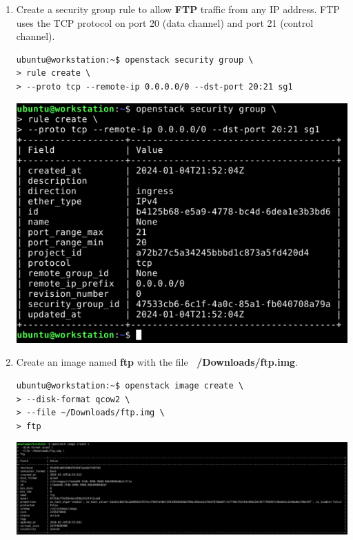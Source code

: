 \documentclass[letterpaper, 12pt]{article}
\begin{document}
\begin{enumerate}
    \item Create a security group rule to allow \textbf{FTP} traffic from any IP address. FTP uses the TCP protocol on
    port 20 (data channel) and port 21 (control channel).
\begin{lstlisting}
ubuntu@workstation:~$ openstack security group \
> rule create \
> --proto tcp --remote-ip 0.0.0.0/0 --dst-port 20:21 sg1
\end{lstlisting}

    \begin{center}
        \includegraphics[width=\linewidth]{images/part1/step32.png}
    \end{center}

    \item Create an image named \textbf{ftp} with the file \textbf{~/Downloads/ftp.img}.
\begin{lstlisting}
ubuntu@workstation:~$ openstack image create \
> --disk-format qcow2 \
> --file ~/Downloads/ftp.img \
> ftp
\end{lstlisting}

\begin{center}
    \includegraphics[width=\linewidth]{images/part1/step33.png}
\end{center}


\end{enumerate}
\end{document}
